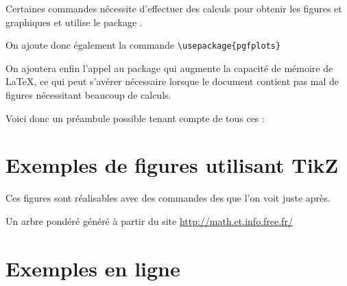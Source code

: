 Certaines commandes  nécessite d'effectuer des calculs pour obtenir les figures et graphiques et utilise le package .

On ajoute donc également la commande 
\verb!\usepackage{pgfplots}!

On ajoutera enfin l'appel au package  qui augmente la capacité de mémoire de \LaTeX{}, ce qui peut s'avérer nécessaire lorsque le document contient pas mal de figures nécessitant beaucoup de calculs.

Voici donc un préambule possible tenant compte de tous ces  :

\medskip


\medskip

\section{Exemples de figures utilisant TikZ}

\begin{info}
Ces figures sont réalisables avec des commandes des   que l'on voit juste après.
\end{info}


\medskip


\medskip

\medskip


\medskip

\medskip


\medskip

\medskip

Un arbre pondéré généré à partir du site \url{http://math.et.info.free.fr/}

\medskip

\medskip


\medskip


\section{Exemples en ligne}

